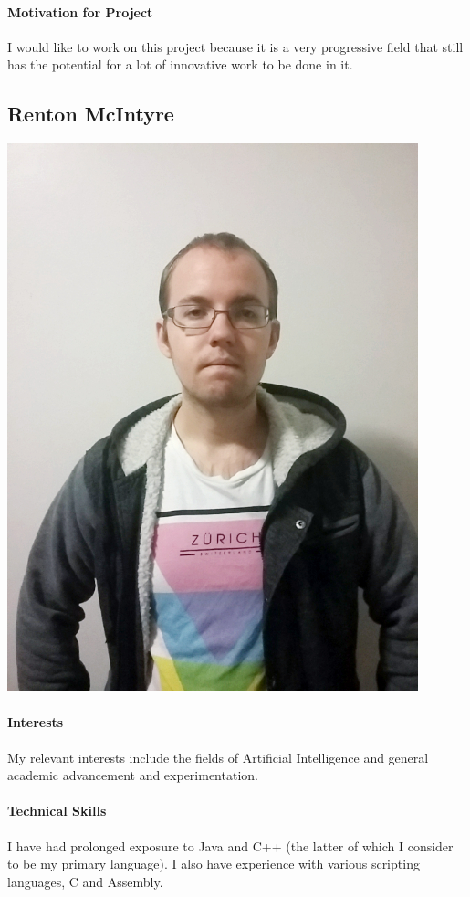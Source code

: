 \documentclass[12pt]{article}
\begin{document}
\paragraph{Motivation for Project}
	I would like to work on this project because it is a very progressive field that still has the potential for a lot of innovative work to be done in it.

\subsection{Renton McIntyre}
\includegraphics[scale=0.25]{Renton}
\paragraph{Interests}
My relevant interests include the fields of Artificial Intelligence and general academic advancement and experimentation.
\paragraph{Technical Skills}
I have had prolonged exposure to Java and C++ (the latter of which I consider to be my primary language). I also have experience with various scripting languages, C and Assembly.
\end{document}

